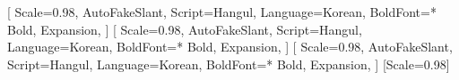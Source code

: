 \usepackage{kotex}
[
    Scale=0.98,
    AutoFakeSlant,
    Script=Hangul,
    Language=Korean,
    BoldFont=* Bold,
    Expansion,
]
\setsansfont{Noto Sans CJK KR}[
    Scale=0.98,
    AutoFakeSlant,
    Script=Hangul,
    Language=Korean,
    BoldFont=* Bold,
    Expansion,
]
[
    Scale=0.98,
    AutoFakeSlant,
    Script=Hangul,
    Language=Korean,
    BoldFont=* Bold,
    Expansion,
]
\setmonofont{IBM Plex Mono}[Scale=0.98]

\usepackage{setspace}

\usepackage{tabularray}

\usepackage{minted}

\newcommand{\latex}{\textrm{\LaTeX{}}}
\newcommand{\tex}{\textrm{\TeX{}}}
